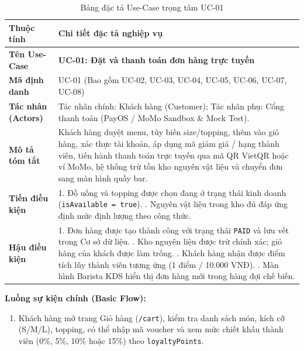 \documentclass[11pt,a4paper]{article}
\begin{document}
\begin{table}[H]
\centering
\small
\renewcommand{\arraystretch}{0.88}
\begin{tabularx}{\linewidth}{|p{3.2cm}|Y|}
\hline
{}
\textbf{Thuộc tính} & \textbf{Chi tiết đặc tả nghiệp vụ} \\ \hline
\textbf{Tên Use-Case} & \textbf{UC-01: Đặt và thanh toán đơn hàng trực tuyến} \\ \hline
\textbf{Mã định danh} & UC-01 (Bao gồm UC-02, UC-03, UC-04, UC-05, UC-06, UC-07, UC-08) \\ \hline
\textbf{Tác nhân (Actors)} & Tác nhân chính: Khách hàng (Customer); Tác nhân phụ: Cổng thanh toán (PayOS / MoMo Sandbox \& Mock Test). \\ \hline
\textbf{Mô tả tóm tắt} & Khách hàng duyệt menu, tùy biến size/topping, thêm vào giỏ hàng, xác thực tài khoản, áp dụng mã giảm giá / hạng thành viên, tiến hành thanh toán trực tuyến qua mã QR VietQR hoặc ví MoMo, hệ thống trừ tồn kho nguyên vật liệu và chuyển đơn sang màn hình quầy bar. \\ \hline
\textbf{Tiền điều kiện} & 1. Đồ uống và topping được chọn đang ở trạng thái kinh doanh (\texttt{isAvailable = true}). . Nguyên vật liệu trong kho đủ đáp ứng định mức định lượng theo công thức. \\ \hline
\textbf{Hậu điều kiện} & 1. Đơn hàng được tạo thành công với trạng thái \texttt{PAID} và lưu vết trong Cơ sở dữ liệu. . Kho nguyên liệu được trừ chính xác; giỏ hàng của khách được làm trống. . Khách hàng nhận được điểm tích lũy thành viên tương ứng (1 điểm / 10.000 VNĐ). . Màn hình Barista KDS hiển thị đơn hàng mới trong hàng đợi chế biến. \\ \hline
\end{tabularx}
\caption{Bảng đặc tả Use-Case trọng tâm UC-01}
\label{tab:uc01}
\end{table}

\textbf{Luồng sự kiện chính (Basic Flow):}
\begin{enumerate}[leftmargin=*]
    \item Khách hàng mở trang Giỏ hàng (\texttt{/cart}), kiểm tra danh sách món, kích cỡ (S/M/L), topping, có thể nhập mã voucher và xem mức chiết khấu thành viên (0\%, 5\%, 10\% hoặc 15\%) theo \texttt{loyaltyPoints}.
\end{enumerate}
\clearpage
\end{document}
